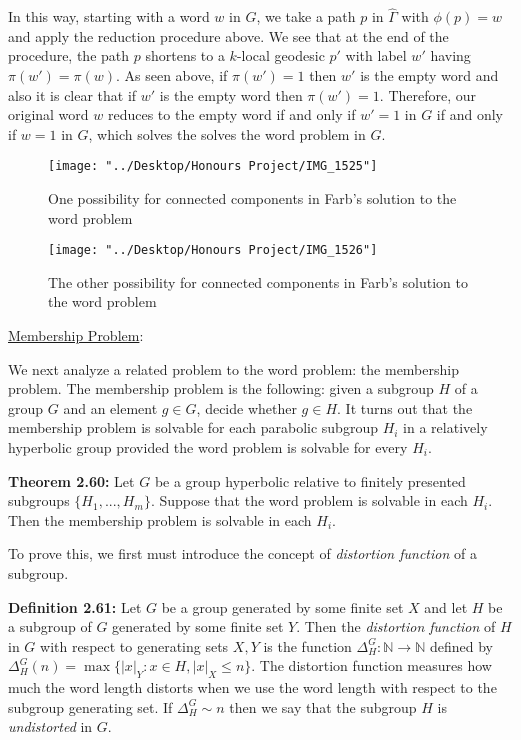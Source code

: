 \documentclass[12pt]{article}
\newcommand{\vs}{\vskip10pt}
\begin{document}
	\vs 
	
	In this way, starting with a word $w$ in $G$, we take a path $p$ in $\hat{\Gamma}$ with $\phi(p) = w$ and apply the reduction procedure above. We see that at the end of the procedure, the path $p$ shortens to a $k$-local geodesic $p'$ with label $w'$ having $\pi(w') = \pi(w)$. As seen above, if $\pi(w') = 1$ then $w'$ is the empty word and also it is clear that if $w'$ is the empty word then $\pi(w') = 1$. Therefore, our original word $w$ reduces to the empty word if and only if $w' = 1$ in $G$ if and only if $w = 1$ in $G$, which solves the solves the word problem in $G$. 
	
	
\begin{figure} [H]
	\centering
	\texttt{[image: "../Desktop/Honours Project/IMG\_1525"]}
	\caption{One possibility for connected components in Farb's solution to the word problem}
	\label{fig:img1525}
\end{figure}

\begin{figure} [H]
	\centering
	\texttt{[image: "../Desktop/Honours Project/IMG\_1526"]}
	\caption{The other possibility for connected components in Farb's solution to the word problem}
	\label{fig:img1526}
\end{figure}


	\vs 

	\underline{Membership Problem}: 
	
	\vs 
	
	We next analyze a related problem to the word problem: the membership problem. The membership problem is the following: given a subgroup $H$ of a group $G$ and an element $g \in G$, decide whether $g \in H$. It turns out that the membership problem is solvable for each parabolic subgroup $H_i$ in a relatively hyperbolic group provided the word problem is solvable for every $H_i$. 
	
	\vs
	
	\textbf{Theorem 2.60: } Let $G$ be a group hyperbolic relative to finitely presented subgroups $\{H_1,...,H_m\}$. Suppose that the word problem is solvable in each $H_i$. Then the membership problem is solvable in each $H_i$. 
	
	\vs 
	
	To prove this, we first must introduce the concept of \textit{distortion function} of a subgroup. 
	
	\vs
	
	\textbf{Definition 2.61: } Let $G$ be a group generated by some finite set $X$ and let $H$ be a subgroup of $G$ generated by some finite set $Y$. Then the \textit{distortion function} of $H$ in $G$ with respect to generating sets $X,Y$ is the function $\Delta_H^G : \mathbb{N} \rightarrow \mathbb{N} $ defined by $\Delta_H^G (n) = \max \{ \vert x \vert_Y : x \in H, \vert x \vert_X \leq n\}$. The distortion function measures how much the word length distorts when we use the word length with respect to the subgroup generating set. If $\Delta_H^G \sim n$ then we say that the subgroup $H$ is \textit{undistorted} in $G$. 
	
\end{document}
